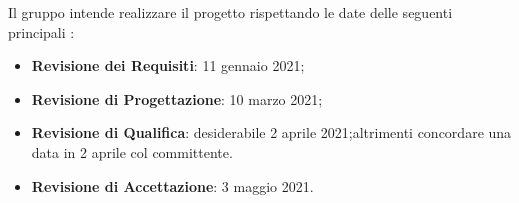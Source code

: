 Il gruppo \Gruppo{} intende realizzare il progetto \NomeProgetto{} rispettando le date delle seguenti principali :
\begin{itemize}
    \item \textbf{Revisione dei Requisiti}: 11 gennaio 2021;
    \item \textbf{Revisione di Progettazione}: 10 marzo 2021;
    \item \textbf{Revisione di Qualifica}: desiderabile 2 aprile 2021;altrimenti concordare una data in 2 aprile col committente.
    \item \textbf{Revisione di Accettazione}: 3 maggio 2021.
\end{itemize}